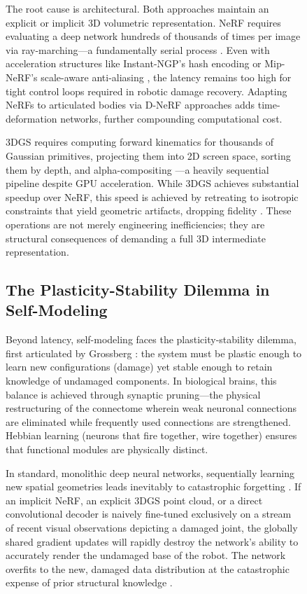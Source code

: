 \documentclass[12pt,a4paper,oneside]{report}
\begin{document}
\begin{figure}[H]
The root cause is architectural. Both approaches maintain an explicit or implicit 3D volumetric representation. NeRF requires evaluating a deep network hundreds of thousands of times per image via ray-marching---a fundamentally serial process \cite{mildenhall2020nerf}. Even with acceleration structures like Instant-NGP's hash encoding \cite{muller2022instant} or Mip-NeRF's scale-aware anti-aliasing \cite{barron2021mip}, the latency remains too high for tight control loops required in robotic damage recovery. Adapting NeRFs to articulated bodies via D-NeRF approaches \cite{pumarola2021d} adds time-deformation networks, further compounding computational cost.

3DGS requires computing forward kinematics for thousands of Gaussian primitives, projecting them into 2D screen space, sorting them by depth, and alpha-compositing \cite{kerbl20233d}---a heavily sequential pipeline despite GPU acceleration. While 3DGS achieves substantial speedup over NeRF, this speed is achieved by retreating to isotropic constraints that yield geometric artifacts, dropping fidelity \cite{hu2025learning}. These operations are not merely engineering inefficiencies; they are structural consequences of demanding a full 3D intermediate representation.

\subsection{The Plasticity-Stability Dilemma in Self-Modeling}
\label{subsec:plasticity_stability}

Beyond latency, self-modeling faces the plasticity-stability dilemma, first articulated by Grossberg \cite{grossberg1987competitive}: the system must be plastic enough to learn new configurations (damage) yet stable enough to retain knowledge of undamaged components. In biological brains, this balance is achieved through synaptic pruning---the physical restructuring of the connectome wherein weak neuronal connections are eliminated while frequently used connections are strengthened. Hebbian learning (neurons that fire together, wire together) ensures that functional modules are physically distinct.

In standard, monolithic deep neural networks, sequentially learning new spatial geometries leads inevitably to catastrophic forgetting \cite{mccloskey1989catastrophic, french1999catastrophic}. If an implicit NeRF, an explicit 3DGS point cloud, or a direct convolutional decoder is naively fine-tuned exclusively on a stream of recent visual observations depicting a damaged joint, the globally shared gradient updates will rapidly destroy the network's ability to accurately render the undamaged base of the robot. The network overfits to the new, damaged data distribution at the catastrophic expense of prior structural knowledge \cite{kirkpatrick2017overcoming}.


\end{figure}
\end{document}
